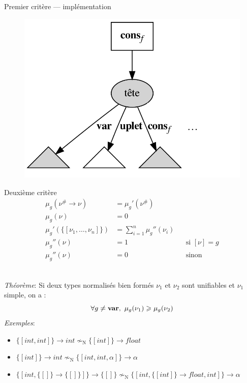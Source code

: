\documentclass[serif]{beamer}
\newcommand{\exemples}{\textit{Exemples}\xspace}
\newcommand{\theoreme}{\textit{Théorème}\xspace}
\newcommand{\interval}[2]{[\![#1\,;#2]\!]}
\newcommand{\mset}[1]{\{\![#1]\!\}}
\newcommand{\N}{\mathrm{N}}
\begin{document}
\begin{frame}{Premier critère — implémentation}
\begin{figure}[h]
	\includegraphics[scale=0.12]{graphs/crit1_3}
\end{figure}
\end{frame}


\begin{frame}{Deuxième critère}
\scriptsize
\begin{align*}
		\mu_g (\nu^\# \rightarrow \nu) &=
		\mu_g' (\nu^\#)
	\\
		\mu_g (\nu) &=
		0
	\\
		\mu_g' (\mset{\nu_1, \dots, \nu_n}) &=
		\sum_{i=1}^n \mu_g'' (\nu_i)
	\\
		\mu_g'' (\nu) &=
		1 &&
		\text{si } [\nu] = g
	\\
		\mu_g'' (\nu) &=
		0 &&
		\text{sinon}
\end{align*}
\medskip
{}
\\
\theoreme : Si deux types normalisés bien formés $\nu_1$ et $\nu_2$ sont unifiables et $\nu_1$ simple, on a :
\[ \forall g \neq \bold{var},\ \mu_g (\nu_1) \geqslant \mu_g (\nu_2) \]
\exemples :
\begin{itemize}
	\item $\mset{int, int} \rightarrow int \nsim_\N \mset{int} \rightarrow float$
	\item $\mset{int} \rightarrow int \nsim_\N \mset{int, int, \alpha} \rightarrow \alpha$
	\item $\mset{int, \mset{} \rightarrow \mset{}} \rightarrow \mset{} \nsim_\N \mset{int, \mset{int} \rightarrow float, int} \rightarrow \alpha$
\end{itemize}
\end{frame}
\end{document}
